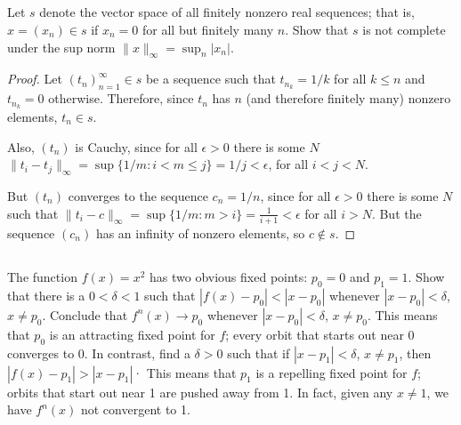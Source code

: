 \subsection{} Let $s$ denote the vector space of all finitely nonzero real  sequences;  that  is, $x = (x_n) \in s$ if $x_n = 0$ for all but finitely many $n$. Show that $s$ is not complete under the sup norm $\|x\|_\infty = \sup_n |x_n|$.

\begin{proof}
Let $(t_n)_{n=1}^\infty \in s$ be a sequence such that $t_{n_k}=1/k$ for all $k \leq n$ and $t_{n_k}=0$ otherwise. Therefore, since $t_n$ has $n$ (and therefore finitely many) nonzero elements, $t_n \in s$.

Also, $(t_n)$ is Cauchy, since for all $\epsilon>0$ there is some $N$ $\|t_i - t_j\|_\infty = \sup\{1/m : i < m \leq j\} = 1/j < \epsilon$, for all $i < j < N$.

But $(t_n)$ converges to the sequence $c_n = 1/n$, since for all $\epsilon > 0$ there is some $N$ such that $\|t_i - c\|_\infty = \sup\{1/m: m > i\} = \frac{1}{i+1} < \epsilon$ for all $i > N$. But the sequence $(c_n)$ has an infinity of nonzero elements, so $c \notin s$.

\end{proof}

\subsection{} The function $f(x) = x^2$ has two obvious fixed points: $p_0 = 0$ and $p_1 = 1$. Show that there is a $0 < \delta < 1$ such that $|f(x) - p_0| < |x - p_0|$ whenever $|x-p_0| < \delta$, $x \neq p_0$. Conclude that $f^n(x) \rightarrow p_0$ whenever $|x-p_0| < \delta$, $x \neq p_0$. This means that $p_0$ is an attracting fixed point for $f$; every orbit that starts out near 0 converges to 0. In contrast, find a $\delta > 0$ such that if $|x - p_1| < \delta$, $x \neq p_1$, then $|f(x) - p_1| > |x - p_1|$· This means that $p_1$ is a repelling fixed point for $f$; orbits that start out near 1 are pushed away from 1. In fact, given any $x \neq 1$, we have $f^n(x)$ not convergent to 1.



